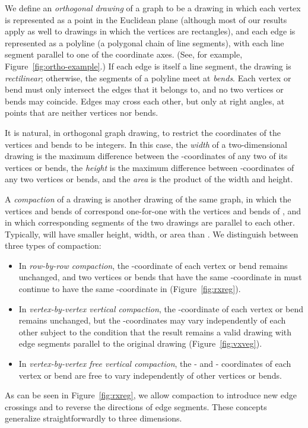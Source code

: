 \documentclass[12pt]{article}
\theoremstyle{definitions}
\begin{document}
We define an \emph{orthogonal drawing} of a graph to be a drawing in which each vertex is represented as a point in the Euclidean plane (although most of our results apply as well to drawings in which the vertices are rectangles), and each edge is represented as a polyline (a polygonal chain of line segments), with each line segment parallel to one of the coordinate axes.
(See, for example, Figure~\ref{fig:ortho-example}.)
If each edge is itself a line segment, the drawing is \emph{rectilinear}; otherwise, the segments of a polyline meet at \emph{bends}. Each vertex or bend must only intersect the edges that it belongs to, and no two vertices or bends may coincide. Edges may cross each other, but only at right angles, at points that are neither vertices nor bends.

It is natural, in orthogonal graph drawing, to restrict the coordinates of the vertices and bends to be integers. In this case, the \emph{width} of a two-dimensional drawing is the maximum difference between the -coordinates of any two of its vertices or bends, the \emph{height} is the maximum difference between -coordinates of any two vertices or bends, and the \emph{area} is the product of the width and height.

A \emph{compaction} of a drawing  is another drawing  of the same graph, in which the vertices and bends of  correspond one-for-one with the vertices and bends of , and in which corresponding segments of the two drawings are parallel to each other. Typically,  will have smaller height, width, or area than . We distinguish between three types of compaction:
\begin{itemize}
\item In \emph{row-by-row compaction}, the -coordinate of each vertex or bend remains unchanged, and two vertices or bends that have the same -coordinate in  must continue to have the same -coordinate in  (Figure~\ref{fig:rxreg}).
\item In \emph{vertex-by-vertex vertical compaction},  the -coordinate of each vertex or bend remains unchanged, but the -coordinates may vary independently of each other subject to the condition that the result remains a valid drawing with  edge segments parallel to the original drawing (Figure~\ref{fig:vxveg}).
\item In  \emph{vertex-by-vertex free vertical compaction}, the - and - coordinates of each vertex or bend are free to vary independently of other vertices or bends.
\end{itemize}
As can be seen in Figure~\ref{fig:rxreg}, we allow compaction to introduce new edge crossings and to reverse the directions of edge segments.
These concepts generalize straightforwardly to three dimensions.
\end{document}
